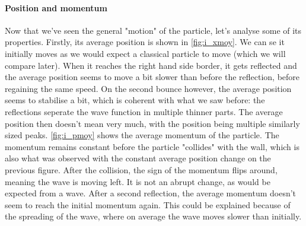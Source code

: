 \paragraph{Position and momentum} Now that we've seen the general "motion" of the particle, let's analyse some of its properties. Firstly, its average position is shown in \autoref{fig:i_xmoy}. We can se it initially moves as we would expect a classical particle to move (which we will compare later). When it reaches the right hand side border, it gets reflected and the average position seems to move a bit slower than before the reflection, before regaining the same speed. On the second bounce however, the average position seems to stabilise a bit, which is coherent with what we saw before: the reflections seperate the wave function in multiple thinner parts. The average position then doesn't mean very much, with the position being multiple similarly sized peaks. \autoref{fig:i_pmoy} shows the average momentum of the particle. The momentum remains constant before the particle "collides" with the wall, which is also what was observed with the constant average position change on the previous figure. After the collision, the sign of the momentum flips around, meaning the wave is moving left. It is not an abrupt change, as would be expected from a wave. After a second reflection, the average momentum doesn't seem to reach the initial momentum again. This could be explained because of the spreading of the wave, where on average the wave moves slower than initially.


